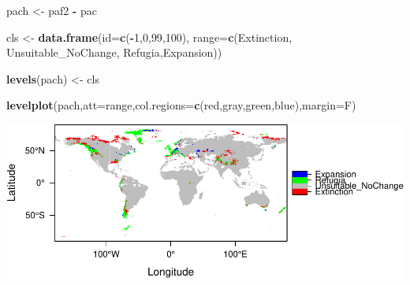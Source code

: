 \documentclass[
]{article}
\newenvironment{Shaded}{\begin{snugshade}}{\end{snugshade}}
\newcommand{\AttributeTok}[1]{\textcolor[rgb]{0.13,0.29,0.53}{#1}}
\newcommand{\DecValTok}[1]{\textcolor[rgb]{0.00,0.00,0.81}{#1}}
\newcommand{\FunctionTok}[1]{\textcolor[rgb]{0.13,0.29,0.53}{\textbf{#1}}}
\newcommand{\NormalTok}[1]{#1}
\newcommand{\OtherTok}[1]{\textcolor[rgb]{0.56,0.35,0.01}{#1}}
\newcommand{\SpecialCharTok}[1]{\textcolor[rgb]{0.81,0.36,0.00}{\textbf{#1}}}
\newcommand{\StringTok}[1]{\textcolor[rgb]{0.31,0.60,0.02}{#1}}
\begin{document}
\begin{Shaded}
\begin{Highlighting}[]
\NormalTok{pach }\OtherTok{\textless{}{-}}\NormalTok{ paf2 }\SpecialCharTok{{-}}\NormalTok{ pac}


\NormalTok{cls }\OtherTok{\textless{}{-}} \FunctionTok{data.frame}\NormalTok{(}\AttributeTok{id=}\FunctionTok{c}\NormalTok{(}\SpecialCharTok{{-}}\DecValTok{1}\NormalTok{,}\DecValTok{0}\NormalTok{,}\DecValTok{99}\NormalTok{,}\DecValTok{100}\NormalTok{), }
                  \AttributeTok{range=}\FunctionTok{c}\NormalTok{(}\StringTok{\textquotesingle{}Extinction\textquotesingle{}}\NormalTok{, }\StringTok{\textquotesingle{}Unsuitable\_NoChange\textquotesingle{}}\NormalTok{, }
                          \StringTok{\textquotesingle{}Refugia\textquotesingle{}}\NormalTok{,}\StringTok{\textquotesingle{}Expansion\textquotesingle{}}\NormalTok{))}

\FunctionTok{levels}\NormalTok{(pach) }\OtherTok{\textless{}{-}}\NormalTok{ cls}


\FunctionTok{levelplot}\NormalTok{(pach,}\AttributeTok{att=}\StringTok{\textquotesingle{}range\textquotesingle{}}\NormalTok{,}\AttributeTok{col.regions=}\FunctionTok{c}\NormalTok{(}\StringTok{\textquotesingle{}red\textquotesingle{}}\NormalTok{,}\StringTok{\textquotesingle{}gray\textquotesingle{}}\NormalTok{,}\StringTok{\textquotesingle{}green\textquotesingle{}}\NormalTok{,}\StringTok{\textquotesingle{}blue\textquotesingle{}}\NormalTok{),}\AttributeTok{margin=}\NormalTok{F)}
\end{Highlighting}
\end{Shaded}

\includegraphics{sdm_R_files/figure-latex/unnamed-chunk-11-8.pdf}
\end{document}
